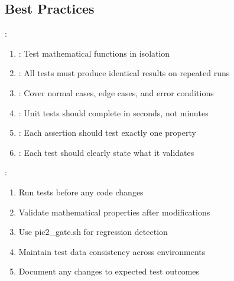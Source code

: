 \documentclass[letterpaper,10pt,english]{sphinxmanual}
\begin{document}
\subsection{Best Practices}
\label{\detokenize{testing:best-practices}}
\sphinxAtStartPar
{}:
\begin{enumerate}
%
\item {} 
\sphinxAtStartPar
{}: Test mathematical functions in isolation

\item {} 
\sphinxAtStartPar
{}: All tests must produce identical results on repeated runs

\item {} 
\sphinxAtStartPar
{}: Cover normal cases, edge cases, and error conditions

\item {} 
\sphinxAtStartPar
{}: Unit tests should complete in seconds, not minutes

\item {} 
\sphinxAtStartPar
{}: Each assertion should test exactly one property

\item {} 
\sphinxAtStartPar
{}: Each test should clearly state what it validates

\end{enumerate}

\sphinxAtStartPar
{}:
\begin{enumerate}
%
\item {} 
\sphinxAtStartPar
Run tests before any code changes

\item {} 
\sphinxAtStartPar
Validate mathematical properties after modifications

\item {} 
\sphinxAtStartPar
Use pic2\_gate.sh for regression detection

\item {} 
\sphinxAtStartPar
Maintain test data consistency across environments

\item {} 
\sphinxAtStartPar
Document any changes to expected test outcomes

\end{enumerate}
\end{document}
